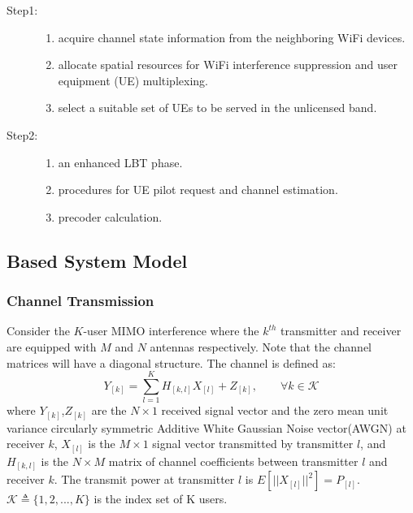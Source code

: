 \documentclass[12pt, onecolumn]{IEEEtran}
\begin{document}
\begin{description}
  \item[Step1:] %
                    \begin{enumerate}
                      \item acquire channel state information from the neighboring WiFi devices.
                      \item allocate spatial resources for WiFi interference suppression and user equipment (UE) multiplexing.
                      \item select a suitable set of UEs to be served in the unlicensed band.
                    \end{enumerate}
  \item[Step2:] %
                    \begin{enumerate}
                        \item an enhanced LBT phase.
                        \item procedures for UE pilot request and channel estimation.
                        \item precoder calculation.
                    \end{enumerate}
\end{description} 
\subsection{Based System Model}
\subsubsection{Channel Transmission}
Consider the $K$-user MIMO interference where the $k^{th}$ transmitter and receiver are equipped with $M$ and $N$ antennas respectively. Note that the channel matrices will have  a diagonal structure. The channel is defined as:
\begin{equation}\label{Channel}
    Y_{[k]} = \sum_{l=1}^{K}H_{[k,l]}X_{[l]} +Z_{[k]}, \qquad  \forall{}k \in \mathcal{K}
\end{equation}
where  $Y_{[k]}$,$Z_{[k]}$ are the $N\times{}1$ received signal vector and the zero mean unit variance circularly symmetric Additive White Gaussian Noise vector(AWGN) at receiver $k$, $X_{[l]}$ is the $M\times{}1$ signal vector transmitted by transmitter $l$, and $H_{[k,l]}$ is the $N\times{}M$ matrix of channel coefficients between transmitter $l$ and receiver $k$. The transmit power at transmitter $l$ is $E[||X_{[l]}||^{2}] = P_{[l]}$. $\mathcal{K} \triangleq \{1,2,...,K\}$ is the index set of K users.
\end{document}
